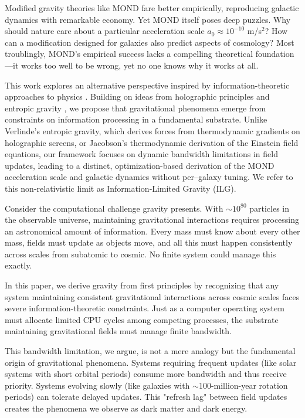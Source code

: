 \documentclass[twocolumn,prd,amsmath,amssymb,aps,superscriptaddress,nofootinbib]{revtex4-2}
\begin{document}
Modified gravity theories like MOND \cite{Milgrom1983} fare better empirically, reproducing galactic dynamics with remarkable economy. Yet MOND itself poses deep puzzles. Why should nature care about a particular acceleration scale $a_0 \approx 10^{-10}$ m/s$^2$? How can a modification designed for galaxies also predict aspects of cosmology? Most troublingly, MOND's empirical success lacks a compelling theoretical foundation---it works too well to be wrong, yet no one knows why it works at all.

This work explores an alternative perspective inspired by information-theoretic approaches to physics \cite{Wheeler1990, Lloyd2002}. Building on ideas from holographic principles \cite{tHooft1993, Susskind1995} and entropic gravity \cite{Verlinde2011, Jacobson1995}, we propose that gravitational phenomena emerge from constraints on information processing in a fundamental substrate. Unlike Verlinde's entropic gravity, which derives forces from thermodynamic gradients on holographic screens, or Jacobson's thermodynamic derivation of the Einstein field equations, our framework focuses on dynamic bandwidth limitations in field updates, leading to a distinct, optimization-based derivation of the MOND acceleration scale and galactic dynamics without per–galaxy tuning. We refer to this non‑relativistic limit as Information‑Limited Gravity (ILG).

Consider the computational challenge gravity presents. With $\sim 10^{80}$ particles in the observable universe, maintaining gravitational interactions requires processing an astronomical amount of information. Every mass must know about every other mass, fields must update as objects move, and all this must happen consistently across scales from subatomic to cosmic. No finite system could manage this exactly.

In this paper, we derive gravity from first principles by recognizing that any system maintaining consistent gravitational interactions across cosmic scales faces severe information-theoretic constraints. Just as a computer operating system must allocate limited CPU cycles among competing processes, the substrate maintaining gravitational fields must manage finite bandwidth.

This bandwidth limitation, we argue, is not a mere analogy but the fundamental origin of gravitational phenomena. Systems requiring frequent updates (like solar systems with short orbital periods) consume more bandwidth and thus receive priority. Systems evolving slowly (like galaxies with $\sim$100-million-year rotation periods) can tolerate delayed updates. This "refresh lag" between field updates creates the phenomena we observe as dark matter and dark energy.
\end{document}
